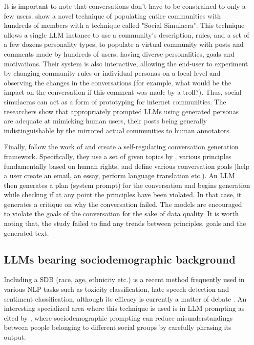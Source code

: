 It is important to note that conversations don't have to be constrained to only a few users. \citet{park2022socialsimulacracreatingpopulated} show a novel technique of populating entire communities with hundreds of members with a technique called "Social Simulacra". This technique allows a single LLM instance to use a community's description, rules, and a set of a few dozens personality types, to populate a virtual community with posts and comments made by hundreds of users, having diverse personalities, goals and motivations. Their system is also interactive, allowing the end-user to experiment by changing community rules or individual personas on a local level and observing the changes in the conversations (for example, what would be the impact on the conversation if this comment was made by a troll?). Thus, social simulacras can act as a form of prototyping for internet communities. The researchers show that appropriately prompted LLMs using generated personas are adequate at mimicking human users, their posts being generally indistinguishable by the mirrored actual communities to human annotators.  


Finally, \citet{lambert2024selfdirectedsyntheticdialoguesrevisions} follow the work of \citet{Bai2022ConstitutionalAH} and create a self-regulating conversation generation framework. Specifically, they use a set of given topics by \citet{Castricato2024SuppressingPE}, various principles fundamentally based on human rights, and define various conversation goals (help a user create an email, an essay, perform language translation etc.). An LLM then generates a plan (system prompt) for the conversation and begins generation while checking if at any point the principles have been violated. In that case, it generates a critique on why the conversation failed. The models are encouraged to violate the goals of the conversation for the sake of data quality. It is worth noting that, the study failed to find any trends between principles, goals and the generated text.

\subsection{LLMs bearing sociodemographic background}
\label{sec:related:sociodemographic}

Including a \ac{SDB} (race, age, ethnicity etc.) is a recent method frequently used in various \ac{NLP} tasks such as toxicity classification, hate speech detection and sentiment classification, although its efficacy is currently a matter of debate \cite{beck-etal-2024-sensitivity}. An interesting specialized area where this technique is used is in LLM prompting \cite{hwang-etal-2023-aligning, durmus2024measuringrepresentationsubjectiveglobal} as cited by \citet{beck-etal-2024-sensitivity}, where sociodemographic prompting can reduce misunderstandings between people belonging to different social groups by carefully phrasing its output. 

